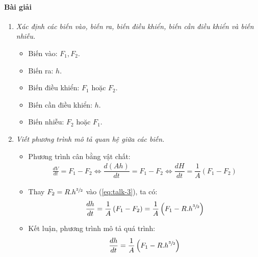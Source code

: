 \documentclass[12pt,a4paper]{article}
\begin{document}
    \paragraph{Bài giải}
        \begin{enumerate}[\it a.]
            \item \textit{Xác định các biến vào, biến ra, biến điều khiển, biến cần điều khiển và biến nhiễu.}
                \begin{itemize}
                    \item Biến vào: $F_1, F_2$.
                    \item Biến ra: $h$.
                    \item Biến điều khiển: $F_1$ hoặc $F_2$.
                    \item Biến cần điều khiển: $h$.
                    \item Biến nhiễu: $F_2$ hoặc $F_1$.
                \end{itemize}

            \item \textit{Viết phương trình mô tả quan hệ giữa các biến.}
                \begin{itemize}
                    \item Phương trình cân bằng vật chất:
                        \begin{align} \label{eq:talk-3}
                            \frac{dV}{dt} = F_1 - F_2 \Longleftrightarrow \dfrac{d \left({A h}\right)}{dt} = F_1 - F_2 \Longleftrightarrow \dfrac{d H}{dt} = \dfrac{1}{A} \left({F_1 - F_2}\right)
                        \end{align}

                    \item Thay $F_2 = R.h^{\sfrac{3}{2}}$ vào (\ref{eq:talk-3}), ta có:
                        \begin{align} \label{eq:talk-3-2}
                            \dfrac{dh}{dt} = \dfrac{1}{A} \left({F_1 - F_2}\right) = \dfrac{1}{A} \left({F_1 - R.h^{\sfrac{3}{2}} }\right)
                        \end{align}

                    \item Kết luận, phương trình mô tả quá trình:
                        \begin{align}
                            \dfrac{dh}{dt} = \dfrac{1}{A} \left({F_1 - R.h^{\sfrac{3}{2}} }\right)
                        \end{align}
                \end{itemize}


\end{enumerate}
\end{document}
